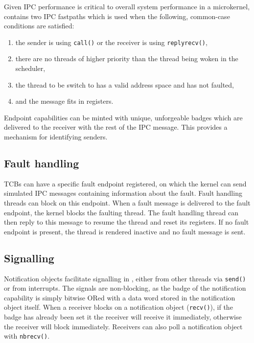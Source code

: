 Given \gls{IPC} performance is critical to overall system performance in a microkernel, \selfour
contains two \gls{IPC} fastpaths which is used when the following, common-case conditions are satisfied:

\begin{enumerate}
    \item the sender is using \texttt{call()} or the receiver is using \texttt{replyrecv()},
    \item there are no threads of higher priority than the thread being woken in the scheduler,
    \item the thread to be switch to has a valid address space and has not faulted,
    \item and the message fits in registers.
\end{enumerate}

Endpoint capabilities can be minted with unique, unforgeable badges which are delivered to the
receiver with the rest of the IPC message. This provides a mechanism for identifying senders.

\subsection{Fault handling}

\glspl{TCB} can have a specific fault endpoint registered, on which the kernel can send simulated
\gls{IPC} messages containing information about the fault. Fault handling threads can block on this 
endpoint. When a fault message is delivered to the fault endpoint, the kernel blocks the faulting
thread. The fault handling thread can then reply to this message to resume the thread and reset its
registers. If no fault endpoint is present, the
thread is rendered inactive and no fault message is sent. 

\subsection{Signalling}

Notification objects facilitate signalling in \selfour, either from other threads via \texttt{send()} or from
interrupts. The signals are non-blocking, as the badge of the notification capability is simply
bitwise ORed with a data word stored in the notification object itself. When a receiver blocks on a
notification object (\texttt{recv()}), if the badge has already been set it the receiver will
receive it immediately, otherwise the receiver will block immediately. Receivers can also poll a
notification object with \texttt{nbrecv()}.


